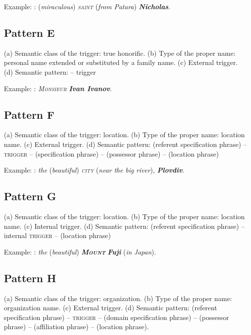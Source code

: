 \documentclass[output=paper]{langsci/langscibook}
\newcommand{\trigger}[1]{\textsc{#1}}
\begin{document}
Example: : (\textit{miraculous}) \textit{\trigger{saint}}\textit{
}(\textit{from Patara})\textit{ }\textbf{\textit{Nicholas}}.


\subsection{Pattern E}

(a) Semantic class of the trigger: true honorific. (b) Type of the
proper name: personal name extended or substituted by a family name.
(c) External trigger. (d) Semantic pattern: – trigger 


Example: :
\textit{\trigger{Monsieur}}\textit{ }\textbf{\textit{Ivan Ivanov}}.

\subsection{Pattern F}

(a) Semantic class of the trigger: location. (b) Type of the proper
name: location name. (c) External trigger. (d) Semantic pattern:
(referent specification phrase) – \trigger{trigger} – (specification
phrase) – (possessor phrase) – (location phrase)



Example: : \textit{the }(\textit{beautiful})\textit{
}\textit{\trigger{city}} (\textit{near the big river})\textit{,}
\textbf{\textit{Plovdiv}}.

\subsection{Pattern G}


(a) Semantic class of the trigger: location. (b) Type of the proper
name: location name. (c) Internal trigger. (d) Semantic pattern:
(referent specification phrase) – internal \trigger{trigger} – (location
phrase)



Example: : \textit{the }(\textit{beautiful})
\textbf{\textit{\trigger{Mount}}}\textbf{\textit{ Fuji}}
(\textit{in}\textit{ Japan}).

\subsection{Pattern H}


(a) Semantic class of the trigger: organization. (b) Type of the proper
name: organization name. (c) External trigger. (d) Semantic pattern:
(referent specification phrase) – \trigger{trigger} – (domain
specification phrase) – (possessor phrase) – (affiliation phrase) –
(location phrase).
\end{document}
